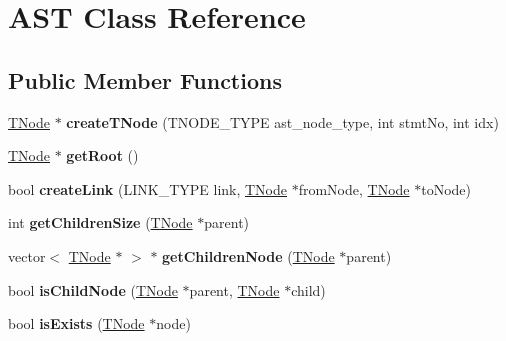 \hypertarget{class_a_s_t}{}\section{A\+S\+T Class Reference}
\label{class_a_s_t}
\subsection*{Public Member Functions}
\begin{DoxyCompactItemize}
\item 
\hypertarget{class_a_s_t_a69486adb9b58e648972d5a2730b940a7}{}\hyperlink{class_t_node}{T\+Node} $\ast$ {\bfseries create\+T\+Node} (T\+N\+O\+D\+E\+\_\+\+T\+Y\+P\+E ast\+\_\+node\+\_\+type, int stmt\+No, int idx)\label{class_a_s_t_a69486adb9b58e648972d5a2730b940a7}

\item 
\hypertarget{class_a_s_t_af92138be77648aa0c6bea999a6c1bf24}{}\hyperlink{class_t_node}{T\+Node} $\ast$ {\bfseries get\+Root} ()\label{class_a_s_t_af92138be77648aa0c6bea999a6c1bf24}

\item 
\hypertarget{class_a_s_t_aebde341b46387da09c308484ed66fa5f}{}bool {\bfseries create\+Link} (L\+I\+N\+K\+\_\+\+T\+Y\+P\+E link, \hyperlink{class_t_node}{T\+Node} $\ast$from\+Node, \hyperlink{class_t_node}{T\+Node} $\ast$to\+Node)\label{class_a_s_t_aebde341b46387da09c308484ed66fa5f}

\item 
\hypertarget{class_a_s_t_a05f6555b15bd47ab73cf35d450858095}{}int {\bfseries get\+Children\+Size} (\hyperlink{class_t_node}{T\+Node} $\ast$parent)\label{class_a_s_t_a05f6555b15bd47ab73cf35d450858095}

\item 
\hypertarget{class_a_s_t_a1e6ce07473e97be9e99785e3ffcdaa46}{}vector$<$ \hyperlink{class_t_node}{T\+Node} $\ast$ $>$ $\ast$ {\bfseries get\+Children\+Node} (\hyperlink{class_t_node}{T\+Node} $\ast$parent)\label{class_a_s_t_a1e6ce07473e97be9e99785e3ffcdaa46}

\item 
\hypertarget{class_a_s_t_a7b81dd32e82c1b6e8229d4160f4bf078}{}bool {\bfseries is\+Child\+Node} (\hyperlink{class_t_node}{T\+Node} $\ast$parent, \hyperlink{class_t_node}{T\+Node} $\ast$child)\label{class_a_s_t_a7b81dd32e82c1b6e8229d4160f4bf078}

\item 
\hypertarget{class_a_s_t_ad802d5d3a47c0141f1fed4a3f175248c}{}bool {\bfseries is\+Exists} (\hyperlink{class_t_node}{T\+Node} $\ast$node)\label{class_a_s_t_ad802d5d3a47c0141f1fed4a3f175248c}


\end{DoxyCompactItemize}
